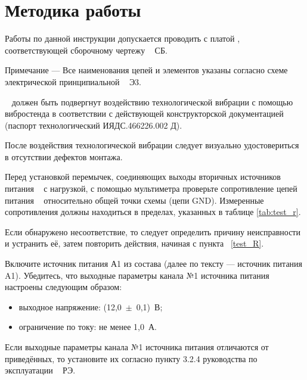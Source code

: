 \section{Методика работы}

  
    \subpoint Работы по данной инструкции допускается проводить с платой \DocProductShortTitle, соответствующей сборочному чертежу \DocProductSignature~ СБ. %
    
    \begin{footnotesize}    
      Примечание --- Все наименования цепей и элементов указаны согласно схеме электрической принципиальной \-\DocProductSignature~ Э3.      
    \end{footnotesize}  
  
    \subpoint \DocProductShortTitle~ должен быть подвергнут воздействию технологической вибрации с помощью вибростенда
    в соответствии с действующей конструкторской документацией (паспорт технологический ИЯДС.466226.002 Д).
    
    \subpoint После воздействия технологической вибрации следует визуально удостовериться в отсутствии дефектов монтажа.
    
  
  \subpoint Перед установкой перемычек, соединяющих выходы вторичных источников питания \DocProductShortTitle~ с нагрузкой,
  с помощью мультиметра проверьте сопротивление цепей питания \DocProductShortTitle~ относительно общей точки схемы (цепи GND).  
  Измеренные сопротивления должны находиться в пределах, указанных в таблице \ref{tab:test_r}.
  \label {test_R} %
  
  
  
  \subpoint Если обнаружено несоответствие, то следует определить причину неисправности и устранить её, затем повторить действия, начиная с пункта~ \ref{test_R}.  
  
  \subpoint Включите источник питания А1 из состава \DocStendShortTitle (далее по тексту --- источник питания A1).
  \subpoint Убедитесь, что выходные параметры канала №1 источника питания настроены следующим образом:
  \begin{itemize}
    \item выходное напряжение: (12,0~$\pm$~0,1)~В;
    \item ограничение по току: не менее 1,0~А.
  \end{itemize}
  \subpoint Если выходные параметры канала №1 источника питания отличаются от приведённых, то установите их согласно пункту 3.2.4 руководства по эксплуатации \DocStendSignature~ РЭ.
    
